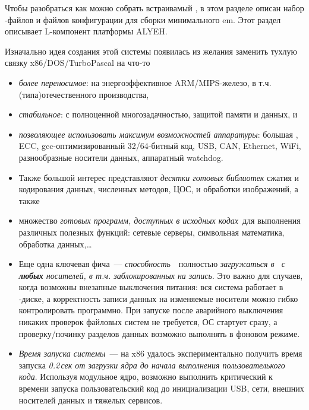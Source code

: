 \label{L}\secdown

Чтобы разобраться как можно собрать встраивамый \linux, в этом разделе описан
набор \make-файлов и файлов конфигурации для сборки минимального em\linux. Этот
раздел описывает L-компонент платформы ALYEH.

\bigskip

Изначально идея создания этой системы появилась из желания заменить тухлую
связку x86/DOS/Tur\-bo\-Pas\-cal на что-то

\begin{itemize}
  \item \emph{более переносимое}: на
 энергоэффективное ARM/MIPS-железо, в т.ч. (типа)отечественного производства,
\item \emph{стабильное}: с полноценной многозадачностью,
защитой памяти и данных, и
\item \emph{позволяющее использовать максимум возможностей аппаратуры}: большая
\ram, ECC, gcc-оп\-ти\-ми\-зи\-ро\-ван\-ный 32/64-битный код, USB, CAN, Ethernet,
WiFi, разнообразные носители данных, аппаратный watchdog.

\item Также большой интерес представляют \emph{десятки готовых библиотек} сжатия
и кодирования данных, численных методов, ЦОС, и обработки изображений, а также

\item множество \emph{готовых программ, доступных в исходных кодах}\ для выполнения различных полезных функций: сетевые серверы,
символьная математика, обработка данных,\ldots

\item Еще одна ключевая фича\ --- \emph{способность}\ \linux\ полностью
\emph{загружаться в \ram\ с \textbf{любых} носителей, в т.ч. заблокированных на
запись}. Это важно для случаев, когда возможны внезапные выключения питания:
вся система работает в \ram-диске, а корректность записи данных на изменяемые
носители можно гибко контролировать программно. При запуске после аварийного
выключения никаких проверок файловых систем не требуется, ОС стартует сразу, а
проверку/починку разделов данных возможно выполнять в фоновом режиме.

\item \emph{Время запуска системы}\ --- на x86 удалось экспериментально получить
время запуска \emph{0.2\,сек от загрузки ядра до начала выполнения
пользователького кода}.
Используя модульное ядро, возможно выполнить критический к времени запуска
пользовательский код до инициализации USB, сети, внешних носителей данных и
тяжелых сервисов.

\end{itemize}

